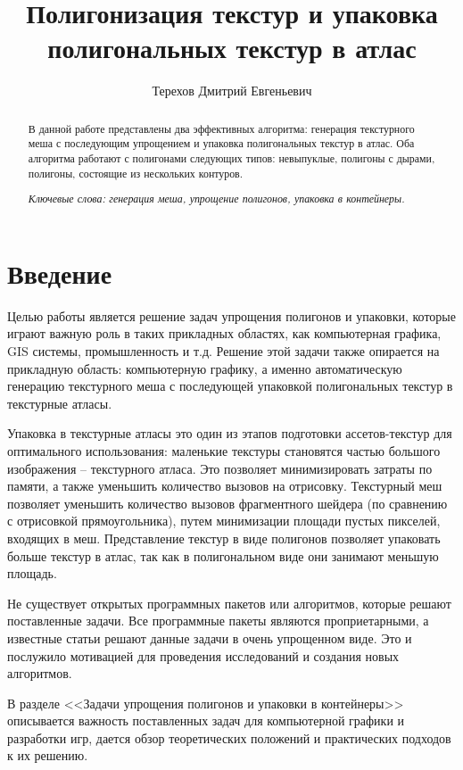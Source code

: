 \documentclass{fefu_thesis/cls/fefu}
\author{Терехов Дмитрий Евгеньевич}
\title{Полигонизация текстур и упаковка полигональных текстур в атлас}
\begin{document}
    \begin{abstract}
        В данной работе представлены два эффективных алгоритма: генерация текстурного меша с последующим упрощением и упаковка полигональных текстур в атлас. Оба алгоритма работают с полигонами следующих типов: невыпуклые, полигоны с дырами, полигоны, состоящие из нескольких контуров.

        \textit{Ключевые слова: генерация меша, упрощение полигонов, упаковка в контейнеры.}
    \end{abstract}
    \pagebreak
    \tableofcontents
    \pagebreak
    {\centering\section*{Введение}}
    Целью работы является решение задач упрощения полигонов и упаковки, которые играют важную роль в таких прикладных областях, как компьютерная графика, GIS системы, промышленность и т.д. Решение этой задачи также опирается на прикладную область: компьютерную графику, а именно автоматическую генерацию текстурного меша с последующей упаковкой полигональных текстур в текстурные атласы.

    Упаковка в текстурные атласы это один из этапов подготовки ассетов-текстур для оптимального использования: маленькие текстуры становятся частью большого изображения -- текстурного атласа. Это позволяет минимизировать затраты по памяти, а также уменьшить количество вызовов на отрисовку. Текстурный меш позволяет уменьшить количество вызовов фрагментного шейдера (по сравнению с отрисовкой прямоугольника), путем минимизации площади пустых пикселей, входящих в меш. Представление текстур в виде полигонов позволяет упаковать больше текстур в атлас, так как в полигональном виде они занимают меньшую площадь.

    Не существует открытых программных пакетов или алгоритмов, которые решают поставленные задачи. Все программные пакеты являются проприетарными, а известные статьи решают данные задачи в очень упрощенном виде. Это и послужило мотивацией для проведения исследований и создания новых алгоритмов.

    В разделе <<Задачи упрощения полигонов и упаковки в контейнеры>> описывается важность поставленных задач для компьютерной графики и разработки игр, дается обзор теоретических положений и практических подходов к их решению.
\end{document}
